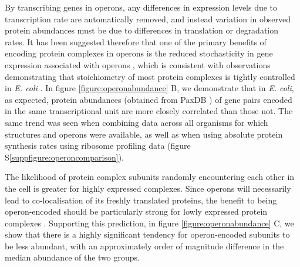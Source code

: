 \documentclass[a4paper,11pt,twoside,openright]{scrbook}
\begin{document}
By transcribing genes in operons, any differences in expression levels due to transcription rate are automatically removed, and instead variation in observed protein abundances must be due to differences in translation or degradation rates. It has been suggested therefore that one of the primary benefits of encoding protein complexes in operons is the reduced stochasticity in gene expression associated with operons \cite{Swain2004,Sneppen2010,Shieh2015a}, which is consistent with observations demonstrating that stoichiometry of most protein complexes is tightly controlled in \textit{E. coli} \cite{Li2014b}. In figure \ref{figure:operonabundance} B, we demonstrate that in \textit{E. coli}, as expected, protein abundances (obtained from PaxDB \cite{Wang2015}) of gene pairs encoded in the same transcriptional unit are more closely correlated than those not. The same trend was seen when combining data across all organisms for which structures and operons were available, as well as when using absolute protein synthesis rates using ribosome profiling data \cite{Li2014b} (figure S\ref{suppfigure:operoncomparison}).

The likelihood of protein complex subunits randomly encountering each other in the cell is greater for highly expressed complexes. Since operons will necessarily lead to co-localisation of its freshly translated proteins, the benefit to being operon-encoded should be particularly strong for lowly expressed protein complexes \cite{Swain2002,Kovacs2009}. Supporting this prediction, in figure \ref{figure:operonabundance} C, we show that there is a highly significant tendency for operon-encoded subunits to be less abundant, with an approximately order of magnitude difference in the median abundance of the two groups.

\clearpage
\end{document}
